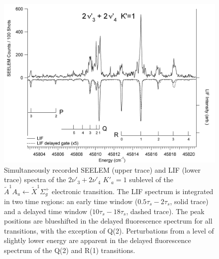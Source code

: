 \documentclass[12pt]{mitthesis}
\begin{document}
\begin{figure}
  \caption{Simultaneously recorded SEELEM (upper trace) and LIF (lower
    trace) spectra of the $2\nu'_3+2\nu'_4$ $K'_a\!=\!1$ sublevel of
    the $\tilde{A}^1A_u \leftarrow \tilde{X} ^1\Sigma_g^+$ electronic
    transition.  The LIF spectrum is integrated in two time regions:
    an early time window ($0.5\tau_s-2\tau_s$, solid trace) and a
    delayed time window ($10\tau_s-18\tau_s$, dashed trace).  The peak
    positions are blueshifted in the delayed fluorescence spectrum for
    all transitions, with the exception of Q(2).  Perturbations from a
    level of slightly lower energy are apparent in the delayed
    fluorescence spectrum of the Q(2) and R(1) transitions.}
  \label{fig:spectrum-32b2}
  \centering
  \includegraphics[width=7in,angle=90]{acetylene-32b2-p3r4.png}
\end{figure}
\end{document}
